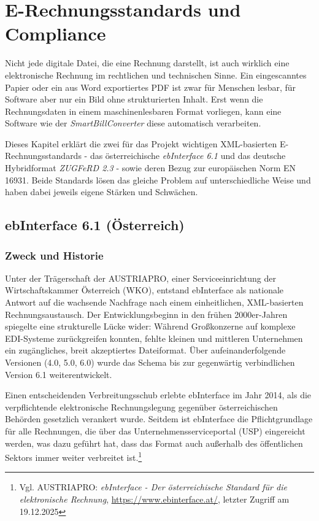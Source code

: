 \chapter{E-Rechnungsstandards und Compliance}
\label{chap:standards_compliance}

Nicht jede digitale Datei, die eine Rechnung darstellt, ist auch wirklich eine elektronische Rechnung im rechtlichen und technischen Sinne. Ein eingescanntes Papier oder ein aus Word exportiertes PDF ist zwar für Menschen lesbar, für Software aber nur ein Bild ohne strukturierten Inhalt. Erst wenn die Rechnungsdaten in einem maschinenlesbaren Format vorliegen, kann eine Software wie der \textit{SmartBillConverter} diese automatisch verarbeiten.

Dieses Kapitel erklärt die zwei für das Projekt wichtigen XML-basierten E-Rechnungsstandards - das österreichische \textit{ebInterface 6.1} und das deutsche Hybridformat \textit{ZUGFeRD 2.3} - sowie deren Bezug zur europäischen Norm EN 16931. Beide Standards lösen das gleiche Problem auf unterschiedliche Weise und haben dabei jeweils eigene Stärken und Schwächen.

\section{ebInterface 6.1 (Österreich)}
\label{sec:ebinterface}

\subsection{Zweck und Historie}
Unter der Trägerschaft der AUSTRIAPRO, einer Serviceeinrichtung der Wirtschaftskammer Österreich (WKO), entstand ebInterface als nationale Antwort auf die wachsende Nachfrage nach einem einheitlichen, XML-basierten Rechnungsaustausch. Der Entwicklungsbeginn in den frühen 2000er-Jahren spiegelte eine strukturelle Lücke wider: Während Großkonzerne auf komplexe EDI-Systeme zurückgreifen konnten, fehlte kleinen und mittleren Unternehmen ein zugängliches, breit akzeptiertes Dateiformat. Über aufeinanderfolgende Versionen (4.0, 5.0, 6.0) wurde das Schema bis zur gegenwärtig verbindlichen Version 6.1 weiterentwickelt.

Einen entscheidenden Verbreitungsschub erlebte ebInterface im Jahr 2014, als die verpflichtende elektronische Rechnungslegung gegenüber österreichischen Behörden gesetzlich verankert wurde. Seitdem ist ebInterface die Pflichtgrundlage für alle Rechnungen, die über das Unternehmensserviceportal (USP) eingereicht werden, was dazu geführt hat, dass das Format auch außerhalb des öffentlichen Sektors immer weiter verbreitet ist.\footnote{Vgl. AUSTRIAPRO: \textit{ebInterface - Der österreichische Standard für die elektronische Rechnung}, \url{https://www.ebinterface.at/}, letzter Zugriff am 19.12.2025}

